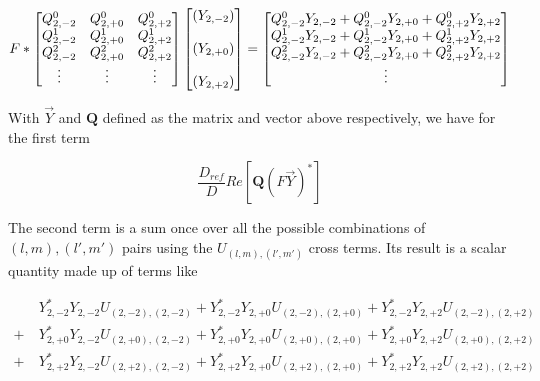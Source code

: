 \documentclass[paper=a4, fontsize=11pt]{scrartcl} %
\numberwithin{equation}{section} %
\numberwithin{figure}{section} %
\numberwithin{table}{section} %
\begin{document}
\begin{equation}
F*
\begin{bmatrix}
Q^0_{2,-2} & Q^0_{2,+0} & Q^0_{2,+2} \\
Q^1_{2,-2} & Q^1_{2,+0} & Q^1_{2,+2} \\ 
Q^2_{2,-2} & Q^2_{2,+0} & Q^2_{2,+2} \\
\vdots & \vdots & \vdots
\end{bmatrix}
\begin{bmatrix}

\left(Y_{2,-2}\right)\\
\hspace{0mm} \\
\left(Y_{2,+0}\right) \\
\hspace{0mm} \\
\left(Y_{2,+2}\right) \\

\end{bmatrix}
=
\begin{bmatrix}
Q^0_{2,-2} Y_{2,-2} + Q^0_{2,-2}Y_{2,+0} + Q^0_{2,+2}Y_{2,+2} \\
Q^1_{2,-2} Y_{2,-2} + Q^1_{2,-2}Y_{2,+0} + Q^1_{2,+2}Y_{2,+2} \\
Q^2_{2,-2} Y_{2,-2} + Q^2_{2,-2}Y_{2,+0} + Q^2_{2,+2}Y_{2,+2} \\
\vdots
\end{bmatrix}

\end{equation} 

With $\vec{Y}$ and $\mathbf{Q}$ defined as the matrix and vector above respectively, we have for the first term

\begin{equation}
\frac{D_{ref}}{D}Re\left[\mathbf{Q}\left(F\vec{Y}\right)^{*}\right]
\end{equation}

The second term is a sum once over all the possible combinations of $(l,m), (l',m')$ pairs using the $U_{(l,m),(l',m')}$ cross terms. Its result is a scalar quantity made up of terms like

\begin{align}
&Y_{2,-2}^{*}Y_{2,-2}U_{(2,-2),(2,-2)} + Y_{2,-2}^{*}Y_{2,+0}U_{(2,-2),(2,+0)} + Y_{2,-2}^{*}Y_{2,+2}U_{(2,-2),(2,+2)} \\ 
 +  \ &Y_{2,+0}^{*}Y_{2,-2}U_{(2,+0),(2,-2)} + Y_{2,+0}^{*}Y_{2,+0}U_{(2,+0),(2,+0)} + Y_{2,+0}^{*}Y_{2,+2}U_{(2,+0),(2,+2)} \\ 
+ \  &Y_{2,+2}^{*}Y_{2,-2}U_{(2,+2),(2,-2)} + Y_{2,+2}^{*}Y_{2,+0}U_{(2,+2),(2,+0)} + Y_{2,+2}^{*}Y_{2,+2}U_{(2,+2),(2,+2)}
\end{align}
\end{document}
